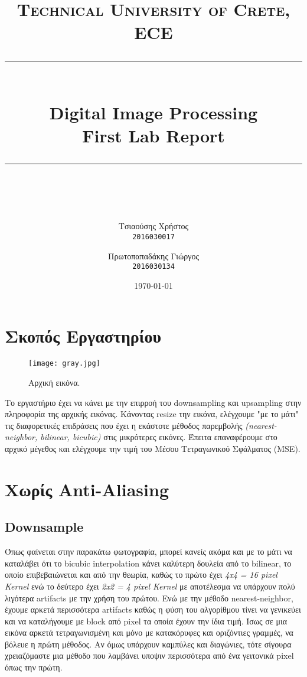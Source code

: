 \documentclass[11pt]{scrartcl} %
\title{
	\normalfont\normalsize
	\textsc{Technical University of Crete, ECE}\\ %
	\vspace{25pt} %
	\rule{\linewidth}{0.5pt}\\ %
	\vspace{20pt} %
	{\Huge Digital Image Processing}\\ %

	{\huge First Lab Report}\\ %
	\vspace{12pt} %
	\rule{\linewidth}{2pt}\\ %
	\vspace{12pt} %
}
\author{\LARGE{Τσιαούσης Χρήστος}\\
		\texttt{2016030017}
		\and
		\LARGE{Πρωτοπαπαδάκης Γιώργος}\\
		\texttt{2016030134}}%
\date{\normalsize\today} %
\begin{document}
\maketitle %


\section{Σκοπός Εργαστηρίου}

\begin{figure}[h] %
	\centering
	\texttt{[image: gray.jpg]} %
	\caption{Αρχική εικόνα.}
\end{figure}


Το εργαστήριο έχει να κάνει με την επιρροή του downsampling και upsampling στην πληροφορία της αρχικής εικόνας. Κάνοντας resize την εικόνα, ελέγχουμε "με το μάτι"
τις διαφορετικές επιδράσεις που έχει η εκάστοτε μέθοδος παρεμβολής \textit{(nearest-neighbor, bilinear, bicubic)} στις μικρότερες εικόνες. Έπειτα
επαναφέρουμε στο αρχικό μέγεθος και ελέγχουμε την τιμή του Μέσου Τετραγωνικού Σφάλματος (MSE).

\section{Xωρίς Αnti-Αliasing}

\subsection{Downsample}

Όπως φαίνεται στην παρακάτω φωτογραφία, μπορεί κανείς ακόμα και με το μάτι να καταλάβει ότι το bicubic interpolation κάνει καλύτερη δουλεία από
το bilinear, το οποίο επιβεβαιώνεται και από την θεωρία, καθώς το πρώτο έχει \textit{4x4 = 16 pixel Kernel} ενώ το δεύτερο έχει
\textit{2x2 = 4 pixel Kernel} με αποτέλεσμα να υπάρχουν πολύ λιγότερα artifacts με την χρήση του πρώτου. Ενώ με την μέθοδο nearest-neighbor,
έχουμε αρκετά περισσότερα artifacts καθώς η φύση του αλγορίθμου τίνει να γενικεύει και να καταλήγουμε με block από pixel τα οποία έχουν την ίδια τιμή.
Ίσως σε μια εικόνα αρκετά τετραγωνισμένη και μόνο με κατακόρυφες και οριζόντιες γραμμές, να βόλευε η πρώτη μέθοδος. Αν όμως υπάρχουν καμπύλες και
διαγώνιες, τότε σίγουρα χρειαζόμαστε μια μέθοδο που λαμβάνει υποψιν περισσότερα από ένα γειτονικά pixel όπως την πρώτη.
\end{document}
